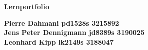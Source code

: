 \documentclass[12pt]{report}
\begin{document}
\newcommand{\paragraphwithnewline}[1]{\paragraph{#1}\mbox{}\\} %
\newcommand{\githubrepo}{\href{https://github.com/Pierrefha/ees-buggy-project}{GitHub-Repository}}

\newcommand{\gquotes}[1]{"`#1"'}
\newcommand{\itoc}{$I^2C$}
\newcommand{\wiringPi}{wiringPi}

\begin{titlepage}
    \begin{center}
        \Huge
        \textbf{Lernportfolio}

        \normalsize
        \textbf{Pierre Dahmani pd1528s 3215892\\
        Jens Peter Dennigmann jd8389s 3190025 \\
        Leonhard Kipp lk2149s 3188047\\}
            
        \vspace{0.8cm}
            

\end{center}
\end{titlepage}
\end{document}
